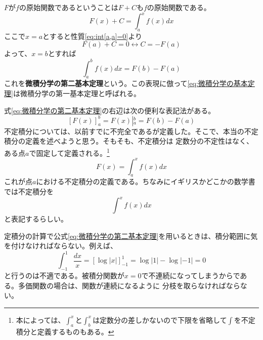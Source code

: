 \documentclass[a4j,dvipdfmx]{jsarticle}
\begin{document}
                $F$が$f$の原始関数であるということは$F+C$も$f$の原始関数である。
                \begin{equation*}
                    F(x)+C = \int_a^x f(x)dx
                \end{equation*}
                ここで$x=a$とすると性質\eqref{eq:int[a,a]=0}より
                \begin{equation*}
                    F(a)+C=0 \leftrightarrow C=-F(a)
                \end{equation*}
                よって、$x=b$とすれば
                \begin{equation}
                    \int_a^b f(x)dx = F(b)-F(a) \label{eq:微積分学の第二基本定理} 
                \end{equation}
                これを\textbf{微積分学の第二基本定理}という。この表現に倣って\eqref{eq:微積分学の基本定理}は微積分学の第一基本定理と呼ばれる。

                式\eqref{eq:微積分学の第二基本定理}の右辺は次の便利な表記法がある。
                \begin{equation*}
                    \left[F(x)\right]_a^b = F(x)\left|_a^b\right. = F(b)-F(a)
                \end{equation*}
                \clearpage
                不定積分については、以前すでに不完全であるが定義した。そこで、本当の不定積分の定義を述べようと思う。そもそも、不定積分は
                定数分の不定性はなく、ある点$a$で固定して定義される。\footnote{本によっては、$\int_a^x$と$\int_b^x$は定数分の差しかないので下限を省略して$\int $を不定積分と定義するものもある。}
                \begin{equation}
                    F(x)=\int_{a}^{x}f(x)dx
                \end{equation}
                これが点$a$における不定積分の定義である。ちなみにイギリスかどこかの数学書では不定積分を
                \begin{equation*}
                    \int^x f(x)dx
                \end{equation*}
                と表記するらしい。

                定積分の計算で公式\eqref{eq:微積分学の第二基本定理}を用いるときは、積分範囲に気を付けなければならない。例えば、
                \begin{equation*}
                    \int_{-1}^{1} \frac{dx}{x} = \left[\log|x|\right]_{-1}^1=\log|1|-\log|-1|=0
                \end{equation*}
                と行うのは不適である。被積分関数が$x=0$で不連続になってしまうからである。多価関数の場合は、関数が連続になるように
                分枝を取らなければならない。
            \clearpage
\end{document}
